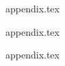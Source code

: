 \newpage

\begin{appendices}


{appendix.tex}

{appendix.tex}

{appendix.tex}




\end{appendices}
% 